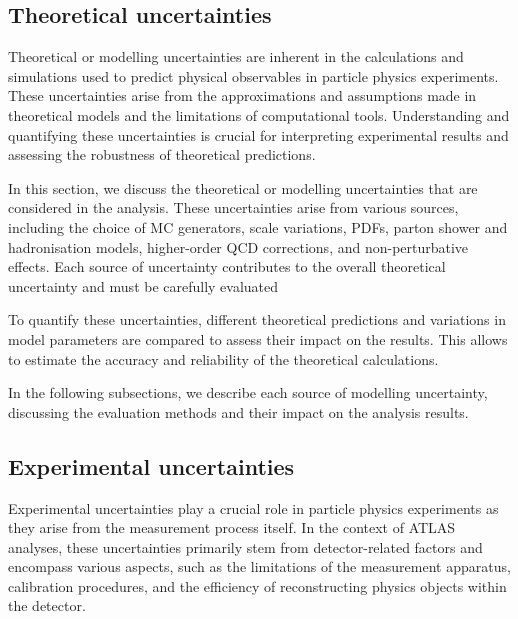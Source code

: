 \subsection{Theoretical uncertainties}
\label{sec:ChaptH:Systematics:Theo}
Theoretical or modelling uncertainties are inherent in the calculations and simulations used to predict 
physical observables in particle physics experiments. These uncertainties arise from the approximations 
and assumptions made in theoretical models and the limitations of computational tools. Understanding 
and quantifying these uncertainties is crucial for interpreting experimental results and assessing the 
robustness of theoretical predictions.

In this section, we discuss the theoretical or modelling uncertainties that are considered in the analysis. 
These uncertainties arise from various sources, including the choice of MC generators, scale variations, 
PDFs, parton shower and hadronisation models, higher-order QCD corrections, and non-perturbative 
effects. Each source of uncertainty contributes to the overall theoretical uncertainty and must be 
carefully evaluated

To quantify these uncertainties, different theoretical predictions and variations in model parameters are 
compared to assess their impact on the results. This allows to estimate the accuracy and reliability of 
the theoretical calculations.

In the following subsections, we describe each source of modelling uncertainty, discussing the 
evaluation methods and their impact on the analysis results. 



\subsection{Experimental uncertainties}
\label{sec:ChaptH:Systematics:Exp}

Experimental uncertainties play a crucial role in particle physics experiments as they arise from the 
measurement process itself. In the context of ATLAS analyses, these uncertainties primarily stem from 
detector-related factors and encompass various aspects, such as the limitations of the measurement 
apparatus, calibration procedures, and the efficiency of reconstructing physics objects within the 
detector.
 
